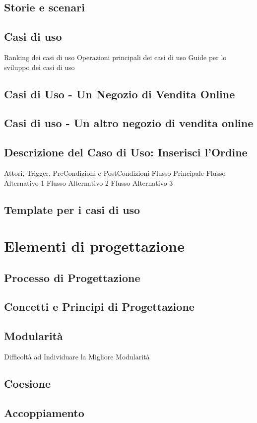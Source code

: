 \documentclass{article}
\begin{document}
	\subsection{Storie e scenari}
	\subsection{Casi di uso}
	Ranking dei casi di uso
	Operazioni principali dei casi di uso
	Guide per lo sviluppo dei casi di uso
	\subsection{Casi di Uso - Un Negozio di Vendita Online}
	\subsection{Casi di uso - Un altro negozio di vendita online}
	\subsection{Descrizione del Caso di Uso: Inserisci l’Ordine}
	Attori, Trigger, PreCondizioni e PostCondizioni
	Flusso Principale
	Flusso Alternativo 1
	Flusso Alternativo 2
	Flusso Alternativo 3
	\subsection{Template per i casi di uso}
	
	\section{Elementi di progettazione}
	\subsection{Processo di Progettazione}
	\subsection{Concetti e Principi di Progettazione}
	\subsection{Modularità}
	Difficoltà ad Individuare la Migliore Modularità
	\subsection{Coesione}
	\subsection{Accoppiamento}
	
\end{document}
